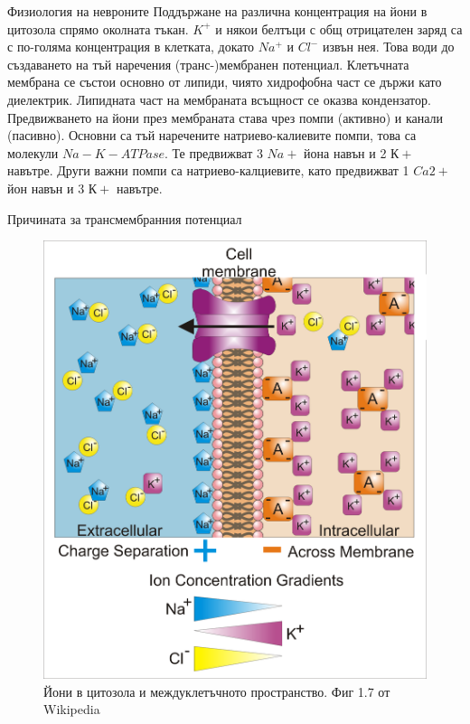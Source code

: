 \begin{frame}[t]{Физиология на невроните}
  Поддържане на различна концентрация на йони в цитозола спрямо околната тъкан.
  $K^{+}$ и някои белтъци с общ отрицателен заряд са с по-голяма концентрация в клетката,
  докато $Na^{+}$ и $Cl^{-}$ извън нея. Това води до създаването на тъй наречения (транс-)мембранен потенциал.
  Клетъчната мембрана се състои основно от липиди, чиято хидрофобна част се държи като диелектрик.
  Липидната част на мембраната всъщност се оказва кондензатор. 
  Предвижването на йони през мембраната става чрез помпи (активно) и канали (пасивно). 
  Основни са тъй наречените натриево-калиевите помпи, това са молекули $Na-K-ATPase$. Те предвижват 3 $Na{+}$ йона навън и 2 $К{+}$ навътре. 
  Други важни помпи са натриево-калциевите, като предвижват 1 $Ca{2+}$ йон навън и 3 $К{+}$ навътре.
\end{frame}

\begin{frame}[t]{Причината за трансмембранния потенциал}
  \begin{figure}[htbp!]
    \centering
    \includegraphics[width=\textwidth,height=0.7\textheight,keepaspectratio]{membrane-potential.png}
    \caption{Йони в цитозола и междуклетъчното пространство. Фиг 1.7 от Wikipedia}
  \end{figure}
\end{frame}

